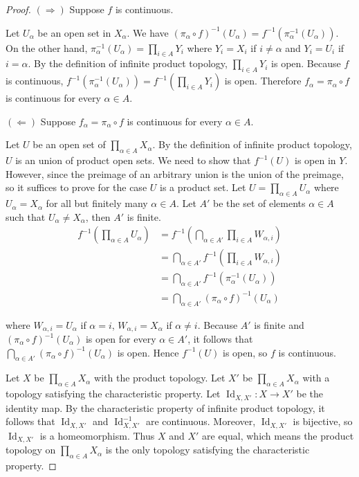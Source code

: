 \begin{proof}
	$(\Rightarrow)$ Suppose $f$ is continuous.

	Let $U_{\alpha}$ be an open set in $X_{\alpha}$. We have ${(\pi_{\alpha}\circ f)}^{-1}(U_{\alpha}) = f^{-1}(\pi_{\alpha}^{-1}(U_{\alpha}))$. On the other hand, $\pi_{\alpha}^{-1}(U_{\alpha}) = \prod_{i\in A}Y_{i}$ where $Y_{i} = X_{i}$ if $i\ne\alpha$ and $Y_{i} = U_{i}$ if $i = \alpha$. By the definition of infinite product topology, $\prod_{i\in A}Y_{i}$ is open. Because $f$ is continuous, $f^{-1}(\pi_{\alpha}^{-1}(U_{\alpha})) = f^{-1}\left(\prod_{i\in A}Y_{i}\right)$ is open. Therefore $f_{\alpha} = \pi_{\alpha}\circ f$ is continuous for every $\alpha\in A$.

	$(\Leftarrow)$ Suppose $f_{\alpha} = \pi_{\alpha}\circ f$ is continuous for every $\alpha\in A$.

	Let $U$ be an open set of $\prod_{\alpha\in A}X_{\alpha}$. By the definition of infinite product topology, $U$ is an union of product open sets. We need to show that $f^{-1}(U)$ is open in $Y$. However, since the preimage of an arbitrary union is the union of the preimage, so it suffices to prove for the case $U$ is a product set. Let $U = \prod_{\alpha\in A}U_{\alpha}$ where $U_{\alpha} = X_{\alpha}$ for all but finitely many $\alpha\in A$. Let $A'$ be the set of elements $\alpha\in A$ such that $U_{\alpha}\ne X_{\alpha}$, then $A'$ is finite.
	\begin{align*}
		f^{-1}\left(\prod_{\alpha\in A}U_{\alpha}\right) & = f^{-1}\left(\bigcap_{\alpha\in A'}\prod_{i\in A}W_{\alpha, i}\right) \\
		                                                 & = \bigcap_{\alpha\in A'}f^{-1}\left(\prod_{i\in A}W_{\alpha,i}\right)  \\
		                                                 & = \bigcap_{\alpha\in A'}f^{-1}(\pi_{\alpha}^{-1}(U_{\alpha}))          \\
		                                                 & = \bigcap_{\alpha\in A'}{(\pi_{\alpha}\circ f)}^{-1}(U_{\alpha})
	\end{align*}

	where $W_{\alpha, i} = U_{\alpha}$ if $\alpha = i$, $W_{\alpha, i} = X_{\alpha}$ if $\alpha\ne i$. Because $A'$ is finite and ${(\pi_{\alpha}\circ f)}^{-1}(U_{\alpha})$ is open for every $\alpha\in A'$, it follows that $\bigcap_{\alpha\in A'}{(\pi_{\alpha}\circ f)}^{-1}(U_{\alpha})$ is open. Hence $f^{-1}(U)$ is open, so $f$ is continuous.

	\bigskip
	Let $X$ be $\prod_{\alpha\in A}X_{\alpha}$ with the product topology. Let $X'$ be $\prod_{\alpha\in A}X_{\alpha}$ with a topology satisfying the characteristic property. Let $\operatorname{Id}_{X,X'}: X\to X'$ be the identity map. By the characteristic property of infinite product topology, it follows that $\operatorname{Id}_{X,X'}$ and $\operatorname{Id}_{X,X'}^{-1}$ are continuous. Moreover, $\operatorname{Id}_{X,X'}$ is bijective, so $\operatorname{Id}_{X,X'}$ is a homeomorphism. Thus $X$ and $X'$ are equal, which means the product topology on $\prod_{\alpha\in A}X_{\alpha}$ is the only topology satisfying the characteristic property.
\end{proof}


